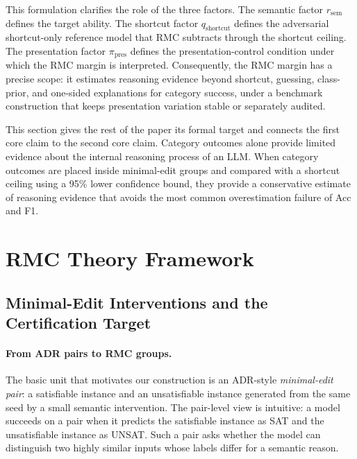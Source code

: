 \documentclass[conference]{IEEEtran}
\theoremstyle{remark}
\newcommand{\reasonFac}{r_{\mathrm{sem}}}
\newcommand{\shortcutFac}{q_{\mathrm{shortcut}}}
\newcommand{\presentationFac}{\pi_{\mathrm{pres}}}
\begin{document}
This formulation clarifies the role of the three factors.  The semantic factor $\reasonFac$ defines the target ability.  The shortcut factor $\shortcutFac$ defines the adversarial shortcut-only reference model that RMC subtracts through the shortcut ceiling.  The presentation factor $\presentationFac$ defines the presentation-control condition under which the RMC margin is interpreted.  Consequently, the RMC margin has a precise scope: it estimates reasoning evidence beyond shortcut, guessing, class-prior, and one-sided explanations for category success, under a benchmark construction that keeps presentation variation stable or separately audited.

This section gives the rest of the paper its formal target and connects the first core claim to the second core claim.  Category outcomes alone provide limited evidence about the internal reasoning process of an LLM.  When category outcomes are placed inside minimal-edit groups and compared with a shortcut ceiling using a 95\% lower confidence bound, they provide a conservative estimate of reasoning evidence that avoids the most common overestimation failure of Acc and F1.













\section{RMC Theory Framework}
\label{sec:theory}

\subsection{Minimal-Edit Interventions and the Certification Target}
\label{sec:groups}

\paragraph{From ADR pairs to RMC groups.}
The basic unit that motivates our construction is an ADR-style \emph{minimal-edit pair}: a satisfiable instance and an unsatisfiable instance generated from the same seed by a small semantic intervention.  The pair-level view is intuitive: a model succeeds on a pair when it predicts the satisfiable instance as SAT and the unsatisfiable instance as UNSAT.  Such a pair asks whether the model can distinguish two highly similar inputs whose labels differ for a semantic reason.
\end{document}

